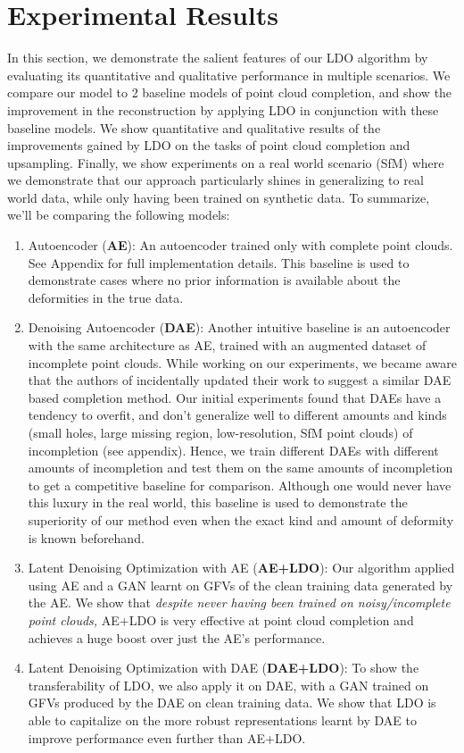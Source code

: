 \documentclass[10pt,twocolumn,letterpaper]{article}
\begin{document}
\section{Experimental Results}
In this section, we demonstrate the salient features of our LDO algorithm by evaluating its quantitative and qualitative performance in multiple scenarios. We compare our model to 2 baseline models of point cloud completion, and show the improvement in the reconstruction by applying LDO in conjunction with these baseline models. We show quantitative and qualitative results of the improvements gained by LDO on the tasks of point cloud completion and upsampling.
Finally, we show experiments on a real world scenario (SfM) where we demonstrate that our approach particularly shines in generalizing to real world data, while only having been trained on synthetic data.
To summarize, we'll be comparing the following models:
\begin{enumerate}
    \item Autoencoder (\textbf{AE}): An autoencoder trained only with complete point clouds. See Appendix for full implementation details. This baseline is used to demonstrate cases where no prior information is available about the deformities in the true data.
    \item Denoising Autoencoder (\textbf{DAE}): Another intuitive baseline is an autoencoder with the same architecture as AE, trained with an augmented dataset of incomplete point clouds.  While working on our experiments, we became aware that the authors of \cite{latentgan} incidentally updated their work to suggest a similar DAE based completion method. Our initial experiments found that DAEs have a tendency to overfit, and don't generalize well to different amounts and kinds (small holes, large missing region, low-resolution, SfM point clouds) of incompletion (see appendix). Hence, we train different DAEs with different amounts of incompletion and test them on the same amounts of incompletion to get a competitive baseline for comparison. Although one would never have this luxury in the real world, this baseline is used to demonstrate the superiority of our method even when the exact kind and amount of deformity is known beforehand. 
    \item Latent Denoising Optimization with AE (\textbf{AE+LDO}): Our algorithm applied using AE and a GAN learnt on GFVs of the clean training data generated by the AE. We show that \textit{despite never having been trained on noisy/incomplete point clouds,} AE+LDO is very effective at point cloud completion and achieves a huge boost over just the AE's performance.
    \item Latent Denoising Optimization with DAE  (\textbf{DAE+LDO}): To show the transferability of LDO, we also apply it on DAE, with a GAN trained on GFVs produced by the DAE on clean training data. We show that LDO is able to capitalize on the more robust representations learnt by DAE to improve performance even further than AE+LDO.  
\end{enumerate}
\end{document}
